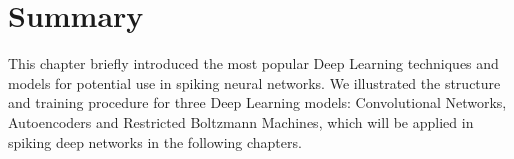 
\section{Summary}
This chapter briefly introduced the most popular Deep Learning techniques and models for potential use in spiking neural networks.
We illustrated the structure and training procedure for three Deep Learning models: Convolutional Networks, Autoencoders and Restricted Boltzmann Machines, which will be applied in spiking deep networks in the following chapters.